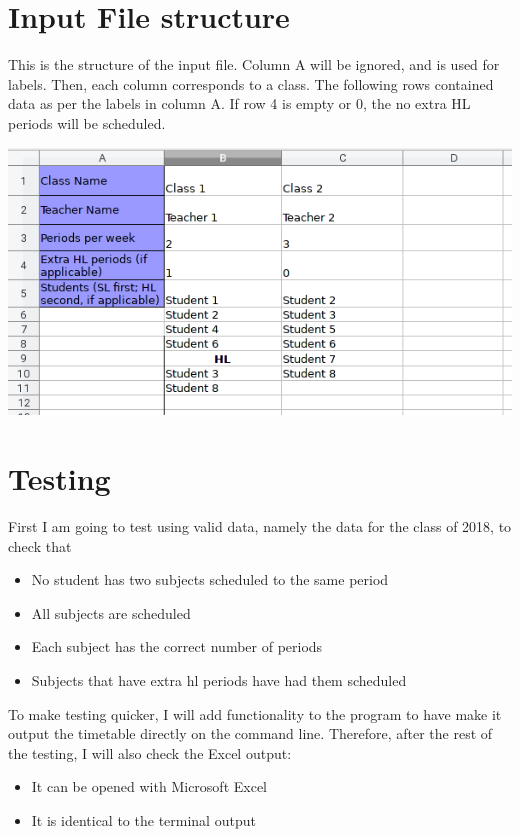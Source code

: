 \documentclass[12pt]{article}
\begin{document}
\section{Input File structure}
This is the structure of the input file. Column A will be ignored, and is used for labels.
Then, each column corresponds to a class. The following rows contained data as per the
labels in column A. If row 4 is empty or 0, the no extra HL periods will be scheduled. 

\includegraphics[width=\textwidth]{data_file_structure.png}

\section{Testing}

First I am going to test using valid data, namely the data for the class of 2018, to check
that
%
\begin{itemize}
    \item No student has two subjects scheduled to the same period
    \item All subjects are scheduled
    \item Each subject has the correct number of periods
    \item Subjects that have extra hl periods have had them scheduled
\end{itemize}
%

To make testing quicker, I will add functionality to the program to have make it output the
timetable directly on the command line. Therefore, after the rest of the testing, I will
also check the Excel output:
%
\begin{itemize}
    \item It can be opened with Microsoft Excel
    \item It is identical to the terminal output
\end{itemize}
%
\end{document}
